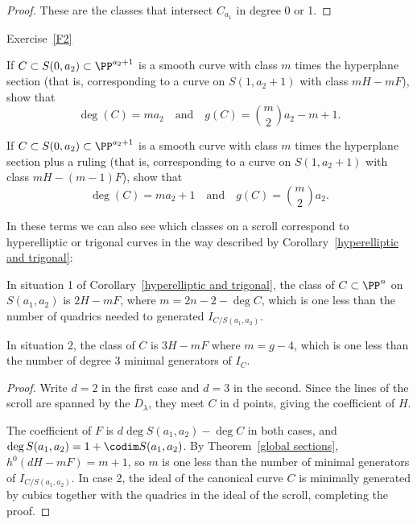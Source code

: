 \begin{proof}
These are the classes that intersect $C_{a_1}$ in degree 0 or 1.
\end{proof}

Exercise~\ref{F2}
\begin{exercise}\label{curves on cones}
\item If $C \subset S(0, a_2) \subset \PP^{a_2+1}$ is a smooth curve with class $m$ times the hyperplane section (that is, corresponding to a curve on $S(1,a_2+1)$ with class $mH - mF$), show that
$$
\deg(C) = ma_2 \quad \text{and} \quad g(C) = \binom{m}{2}a_2 - m + 1.
$$
\item If $C \subset S(0, a_2) \subset \PP^{a_2+1}$ is a smooth curve with class $m$ times the hyperplane section plus a ruling (that is, corresponding to a curve on $S(1,a_2+1)$ with class $mH - (m-1)F$), show that
$$
\deg(C) = ma_2 + 1 \quad \text{and} \quad g(C) = \binom{m}{2}a_2.
$$
\end{exercise}

In these terms we can also see which classes on a scroll correspond to hyperelliptic or trigonal curves in the way described by Corollary~\ref{hyperelliptic and trigonal}:

\begin{corollary}\label{which class}
In situation 1 of Corollary~\ref{hyperelliptic and trigonal}, the class of $C\subset \PP^n$ on $S(a_1,a_2)$ is
$2H - mF$, where $m =  2n-2 - \deg C$, which is one less than the number of quadrics needed to generated $I_{C/S(a_1,a_2)}$.

In situation 2, the class of $C$ is 
$3H -  mF$ where $m = g-4$, which is one less than the number of degree 3 minimal generators of $I_{C}.$
\end{corollary}

\begin{proof} Write $d=2$ in the first case and $d=3$ in the second.
Since the lines of the scroll are spanned by the $D_\lambda$, they meet $C$ in d points, 
giving the coefficient of $H$. 

The coefficient of $F$ is $d\deg S(a_1,a_2) - \deg C$ in both cases, and 
$\deg S(a_1,a_2)= 1+ \codim  S(a_1,a_2)$. By Theorem~\ref{global sections}, 
$h^0(dH-mF) = m+1$, so $m$ is one less than the number of minimal generators
of $I_{C/S(a_1,a_2)}$. In case 2, the ideal of the canonical curve $C$ is minimally
generated by cubics together with  the quadrics in the ideal of the scroll, completing the proof. \end{proof}

